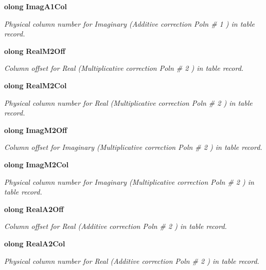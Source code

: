 \begin{CompactItemize}
{\bf olong} {\bf Imag\-A1Col}
\begin{CompactList}\small\item\em Physical column number for Imaginary (Additive correction Poln \# 1 ) in table record. \item\end{CompactList}\item 
{\bf olong} {\bf Real\-M2Off}
\begin{CompactList}\small\item\em Column offset for Real (Multiplicative correction Poln \# 2 ) in table record. \item\end{CompactList}\item 
{\bf olong} {\bf Real\-M2Col}
\begin{CompactList}\small\item\em Physical column number for Real (Multiplicative correction Poln \# 2 ) in table record. \item\end{CompactList}\item 
{\bf olong} {\bf Imag\-M2Off}
\begin{CompactList}\small\item\em Column offset for Imaginary (Multiplicative correction Poln \# 2 ) in table record. \item\end{CompactList}\item 
{\bf olong} {\bf Imag\-M2Col}
\begin{CompactList}\small\item\em Physical column number for Imaginary (Multiplicative correction Poln \# 2 ) in table record. \item\end{CompactList}\item 
{\bf olong} {\bf Real\-A2Off}
\begin{CompactList}\small\item\em Column offset for Real (Additive correction Poln \# 2 ) in table record. \item\end{CompactList}\item 
{\bf olong} {\bf Real\-A2Col}
\begin{CompactList}\small\item\em Physical column number for Real (Additive correction Poln \# 2 ) in table record. \item\end{CompactList}\item 

\end{CompactItemize}
